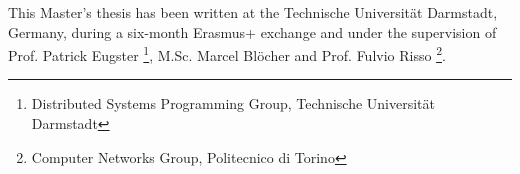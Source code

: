 This Master's thesis has been written at the Technische Universit{\"a}t Darmstadt, Germany, during a six-month Erasmus+ exchange and under the supervision of Prof. Patrick Eugster \footnote[2]{\label{tuda} Distributed Systems Programming Group, Technische Universit{\"a}t Darmstadt}, M.Sc. Marcel Bl{\"o}cher  and Prof. Fulvio Risso \footnote[3]{\label{polito} Computer Networks Group, Politecnico di Torino}.
